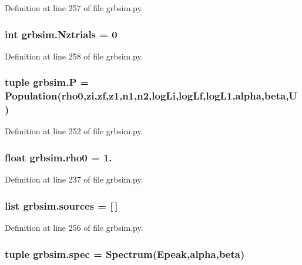 Definition at line 257 of file grbsim.\-py.

\hypertarget{namespacegrbsim_a2206c89978aa1d0492c4d6deee805cd6}{
\subsubsection[{Nztrials}]{\setlength{\rightskip}{0pt plus 5cm}int grbsim.\-Nztrials = 0}}\label{namespacegrbsim_a2206c89978aa1d0492c4d6deee805cd6}


Definition at line 258 of file grbsim.\-py.

\hypertarget{namespacegrbsim_a6ad6e8e40932a7008d72c4ea47741199}{
\subsubsection[{P}]{\setlength{\rightskip}{0pt plus 5cm}tuple grbsim.\-P = {\bf Population}({\bf rho0},{\bf zi},{\bf zf},{\bf z1},{\bf n1},{\bf n2},{\bf log\-Li},{\bf log\-Lf},{\bf log\-L1},{\bf alpha},{\bf beta},{\bf U})}}\label{namespacegrbsim_a6ad6e8e40932a7008d72c4ea47741199}


Definition at line 252 of file grbsim.\-py.

\hypertarget{namespacegrbsim_a121f590c69146cbb7aaef7e00640fd7a}{
\subsubsection[{rho0}]{\setlength{\rightskip}{0pt plus 5cm}float grbsim.\-rho0 = 1.}}\label{namespacegrbsim_a121f590c69146cbb7aaef7e00640fd7a}


Definition at line 237 of file grbsim.\-py.

\hypertarget{namespacegrbsim_aec1771af1de2cff8dfc4ca1a09d80673}{
\subsubsection[{sources}]{\setlength{\rightskip}{0pt plus 5cm}list grbsim.\-sources = \mbox{[}$\,$\mbox{]}}}\label{namespacegrbsim_aec1771af1de2cff8dfc4ca1a09d80673}


Definition at line 256 of file grbsim.\-py.

\hypertarget{namespacegrbsim_a49758929db0a08e363270d0ba42d9847}{
\subsubsection[{spec}]{\setlength{\rightskip}{0pt plus 5cm}tuple grbsim.\-spec = {\bf Spectrum}({\bf Epeak},{\bf alpha},{\bf beta})}}\label{namespacegrbsim_a49758929db0a08e363270d0ba42d9847}


